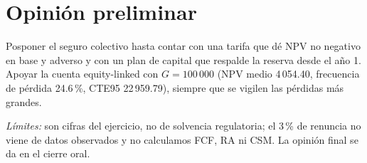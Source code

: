 \documentclass[11pt,a4paper]{article}
\begin{document}
\section*{Opinión preliminar}
Posponer el seguro colectivo hasta contar con una tarifa que dé NPV no negativo en base y
adverso y con un plan de capital que respalde la reserva desde el año 1. Apoyar la cuenta
equity-linked con $G = 100\,000$ (NPV medio 4\,054.40, frecuencia de pérdida 24.6\,\%, CTE95
22\,959.79), siempre que se vigilen las pérdidas más grandes.

\noindent\textit{Límites:} son cifras del ejercicio, no de solvencia regulatoria; el 3\,\% de renuncia no viene
de datos observados y no calculamos FCF, RA ni CSM. La opinión final se da en el cierre oral.
\end{document}

